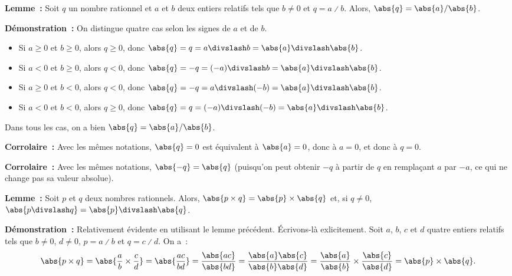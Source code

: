     \done

\medskip

\noindent\textbf{Lemme :} Soit $q$ un nombre rationnel et $a$ et $b$ deux entiers relatifs tels que $b \neq 0$ et $q = a \divslash b$.
    Alors, $\abs{q} = \abs{a} / \abs{b}$.

\medskip

\noindent\textbf{Démonstration :} On distingue quatre cas selon les signes de $a$ et de $b$.
    \begin{itemize}[nosep]
        \item Si $a \geq 0$ et $b \geq 0$, alors $q \geq 0$, donc $\abs{q} = q = a \divslash b = \abs{a} \divslash \abs{b}$.
        \item Si $a < 0$ et $b \geq 0$, alors $q < 0$, donc $\abs{q} = - q = (-a) \divslash b = \abs{a} \divslash \abs{b}$.
        \item Si $a \geq 0$ et $b < 0$, alors $q < 0$, donc $\abs{q} = - q = a \divslash (-b) = \abs{a} \divslash \abs{b}$.
        \item Si $a < 0$ et $b < 0$, alors $q \geq 0$, donc $\abs{q} = q = (-a) \divslash (-b) = \abs{a} \divslash \abs{b}$.
    \end{itemize}
    Dans tous les cas, on a bien $\abs{q} = \abs{a} / \abs{b}$.

    \done

\medskip

\noindent\textbf{Corrolaire :} Avec les mêmes notations, $\abs{q} = 0$ est équivalent à $\abs{a} = 0$, donc à $a = 0$, et donc à $q = 0$.

\medskip

\noindent\textbf{Corrolaire :} Avec les mêmes notations, $\abs{-q} = \abs{q}$ (puisqu'on peut obtenir $-q$ à partir de $q$ en remplaçant $a$ par $-a$, ce qui ne change pas sa valeur absolue).

\medskip

\noindent\textbf{Lemme :} Soit $p$ et $q$ deux nombres rationnels.
    Alors, $\abs{p \times q} = \abs{p} \times \abs{q}$ et, si $q \neq 0$, $\abs{p \divslash q} = \abs{p} \divslash \abs{q}$.

\medskip

\noindent\textbf{Démonstration :} Relativement évidente en utilisant le lemme précédent. 
    Écrivons-là exlicitement.
    Soit $a$, $b$, $c$ et $d$ quatre entiers relatifs tels que $b \neq 0$, $d \neq 0$, $p = a \divslash b$ et $q = c \divslash d$.
    On a : 
    \begin{equation*}
        \abs{p \times q} 
        = \abs{\frac{a}{b} \times \frac{c}{d}}
        = \abs{\frac{a c}{b d}}
        = \frac{\abs{a c}}{\abs{b d}}
        = \frac{\abs{a} \abs{c}}{\abs{b} \abs{d}}
        = \frac{\abs{a}}{\abs{b}} \times \frac{\abs{c}}{\abs{d}}
        = \abs{p} \times \abs{q} .
    \end{equation*}

